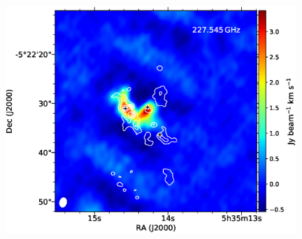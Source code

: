 \begin{figure}[htbp]
\begin{center}
\begin{minipage}{0.98\textwidth}
\begin{center}
\begin{minipage}{0.48\textwidth}
\begin{center}
\includegraphics[width=0.98\textwidth]{OrionKL/mom0/227.545SV_mom0_3-7.eps}
\end{center}
\end{minipage}
\end{center}
\end{minipage}


\end{center}
\end{figure}

